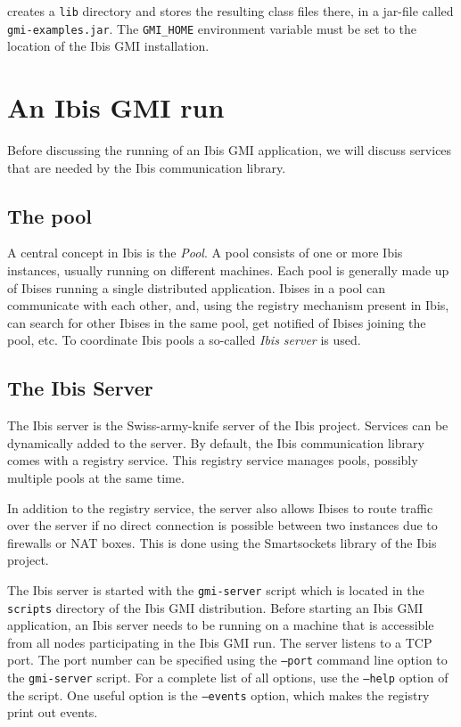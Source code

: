 \documentclass[a4paper,10pt]{article}
\begin{document}
creates a \texttt{lib} directory and stores the resulting class files there,
in a jar-file called \texttt{gmi-examples.jar}.
The \texttt{GMI\_HOME} environment variable must be set to the location of
the Ibis GMI installation.

\section{An Ibis GMI run}

Before discussing
the running of an Ibis GMI application, we will discuss services that are
needed by the Ibis communication library.

\subsection{The pool}

A central concept in Ibis is the \emph{Pool}. A pool consists of one or
more Ibis instances, usually running on different machines. Each pool is
generally made up of Ibises running a single distributed application.
Ibises in a pool can communicate with each other, and, using the
registry mechanism present in Ibis, can search for other Ibises in the
same pool, get notified of Ibises joining the pool, etc. To
coordinate Ibis pools a so-called \emph{Ibis server} is used.

\subsection{The Ibis Server}

The Ibis server is the Swiss-army-knife server of the Ibis project.
Services can be dynamically added to the server. By default, the Ibis
communication library comes with a registry service. This registry
service manages pools, possibly multiple pools at the same time.

In addition to the registry service, the server also allows
Ibises to route traffic over the server if no direct connection is
possible between two instances due to firewalls or NAT boxes. This is
done using the Smartsockets library of the Ibis project.

The Ibis server is started with the \texttt{gmi-server} script which is
located in the \texttt{scripts} directory of the Ibis GMI distribution.  Before
starting an Ibis GMI application, an Ibis server needs to be running on a
machine that is accessible from all nodes participating in the Ibis GMI run.
The server listens to a TCP port. The port number can be specified using
the \texttt{--port} command line option to the \texttt{gmi-server}
script.  For a complete list of all options, use the \texttt{--help}
option of the script. One useful option is the  \texttt{--events}
option, which makes the registry print out events.
\end{document}
